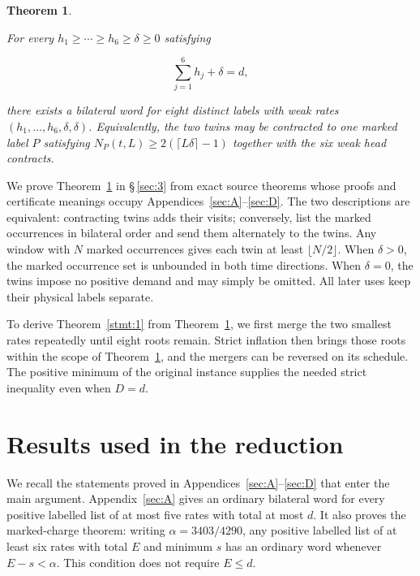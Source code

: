 \documentclass[11pt,a4paper]{article}
\newtheorem{theorem}{Theorem}
\begin{document}
\begin{theorem}\label{stmt:3}

 For every \(h_1\ge\cdots\ge h_6\ge\delta\ge0\) satisfying

\begin{equation}
\sum_{j=1}^{6}h_j+\delta=d,
\tag{3}\label{eq:3}
\end{equation}

there exists a bilateral word for eight distinct labels with weak rates \((h_1,\ldots,h_6,\delta,\delta)\). Equivalently, the two twins may be contracted to one marked label \(P\) satisfying \(N_P(t,L)\ge2(\lceil L\delta\rceil-1)\) together with the six weak head contracts.

\end{theorem}

We prove Theorem~\ref{stmt:3} in \S\,\ref{sec:3} from exact source theorems whose proofs and certificate meanings occupy Appendices~\ref{sec:A}--\ref{sec:D}. The two descriptions are equivalent: contracting twins adds their visits; conversely, list the marked occurrences in bilateral order and send them alternately to the twins. Any window with \(N\) marked occurrences gives each twin at least \(\lfloor N/2\rfloor\). When \(\delta>0\), the marked occurrence set is unbounded in both time directions. When \(\delta=0\), the twins impose no positive demand and may simply be omitted. All later uses keep their physical labels separate.

To derive Theorem~\ref{stmt:1} from Theorem~\ref{stmt:3}, we first merge the two smallest rates repeatedly until eight roots remain. Strict inflation then brings those roots within the scope of Theorem~\ref{stmt:3}, and the mergers can be reversed on its schedule. The positive minimum of the original instance supplies the needed strict inequality even when \(D=d\).

\section{Results used in the reduction}\label{sec:2}

We recall the statements proved in Appendices~\ref{sec:A}--\ref{sec:D} that enter the main argument. Appendix~\ref{sec:A} gives an ordinary bilateral word for every positive labelled list of at most five rates with total at most \(d\). It also proves the marked-charge theorem: writing \(\alpha=3403/4290\), any positive labelled list of at least six rates with total \(E\) and minimum \(s\) has an ordinary word whenever \(E-s<\alpha\). This condition does not require \(E\le d\).
\end{document}
